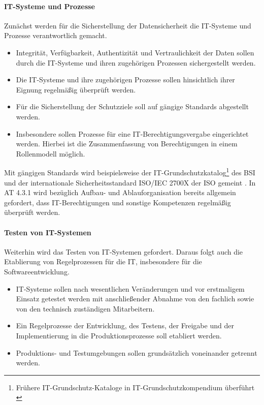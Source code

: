 \paragraph{IT-Systeme und Prozesse}
Zunächst werden für die Sicherstellung der Datensicherheit die IT-Systeme und Prozesse verantwortlich gemacht.
\begin{itemize}
    \item Integrität, Verfügbarkeit, Authentizität und Vertraulichkeit der Daten sollen durch die IT-Systeme und ihren zugehörigen Prozessen sichergestellt werden. 
    \item Die IT-Systeme und ihre zugehörigen Prozesse sollen hinsichtlich ihrer Eignung regelmäßig überprüft werden.
    \item Für die Sicherstellung der Schutzziele soll auf gängige Standards abgestellt werden.
    \item Insbesondere sollen Prozesse für eine IT-Berechtigungsvergabe eingerichtet werden. Hierbei ist die Zusammenfassung von Berechtigungen in einem Rollenmodell möglich.
\end{itemize}
 Mit gängigen Standards wird beispielsweise der IT-Grundschutzkatalog\footnote{Frühere IT-Grundschutz-Kataloge in IT-Grundschutzkompendium überführt \cite{IT-Grundschutz:2020}} des \ac{BSI} und der internationale Sicherheitsstandard ISO/IEC 2700X der \ac{ISO} gemeint \cite{MaRiskErläuterungen:2017}.
 In AT 4.3.1 wird bezüglich Aufbau- und Ablauforganisation bereits allgemein gefordert, dass IT-Berechtigungen und sonstige Kompetenzen regelmäßig überprüft werden.

\paragraph{Testen von IT-Systemen}
 Weiterhin wird das Testen von IT-Systemen gefordert. Daraus folgt auch die Etablierung von Regelprozessen für die IT, insbesondere für die Softwareentwicklung. 
\begin{itemize}
    \item IT-Systeme sollen nach wesentlichen Veränderungen und vor erstmaligem Einsatz getestet werden mit anschließender Abnahme von den fachlich sowie von den technisch zuständigen Mitarbeitern.
    \item Ein Regelprozesse der Entwicklung, des Testens, der Freigabe und der Implementierung in die Produktionsprozesse soll etabliert werden. 
    \item Produktions- und Testumgebungen sollen grundsätzlich voneinander getrennt werden.
\end{itemize}
